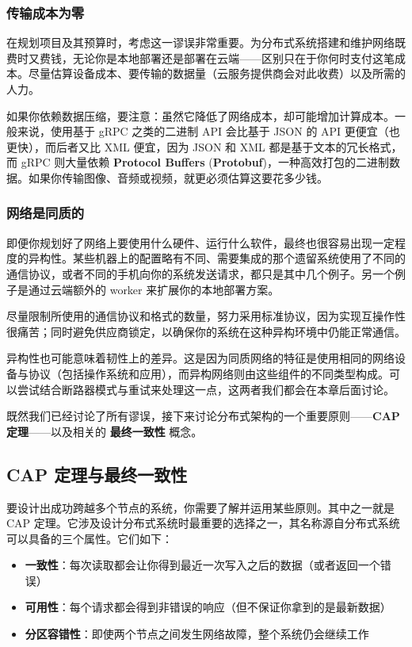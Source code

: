 \subsubsection{传输成本为零}

在规划项目及其预算时，考虑这一谬误非常重要。为分布式系统搭建和维护网络既费时又费钱，无论你是本地部署还是部署在云端——区别只在于你何时支付这笔成本。尽量估算设备成本、要传输的数据量（云服务提供商会对此收费）以及所需的人力。

如果你依赖数据压缩，要注意：虽然它降低了网络成本，却可能增加计算成本。一般来说，使用基于 gRPC 之类的二进制 API 会比基于 JSON 的 API 更便宜（也更快），而后者又比 XML 便宜，因为 JSON 和 XML 都是基于文本的冗长格式，而 gRPC 则大量依赖 \textbf{Protocol Buffers} (\textbf{Protobuf})，一种高效打包的二进制数据。如果你传输图像、音频或视频，就更必须估算这要花多少钱。

\subsubsection{网络是同质的}

即便你规划好了网络上要使用什么硬件、运行什么软件，最终也很容易出现一定程度的异构性。某些机器上的配置略有不同、需要集成的那个遗留系统使用了不同的通信协议，或者不同的手机向你的系统发送请求，都只是其中几个例子。另一个例子是通过云端额外的 worker 来扩展你的本地部署方案。

尽量限制所使用的通信协议和格式的数量，努力采用标准协议，因为实现互操作性很痛苦；同时避免供应商锁定，以确保你的系统在这种异构环境中仍能正常通信。

异构性也可能意味着韧性上的差异。这是因为同质网络的特征是使用相同的网络设备与协议（包括操作系统和应用），而异构网络则由这些组件的不同类型构成。可以尝试结合断路器模式与重试来处理这一点，这两者我们都会在本章后面讨论。

既然我们已经讨论了所有谬误，接下来讨论分布式架构的一个重要原则——\textbf{CAP 定理}——以及相关的 \textbf{最终一致性} 概念。

\subsection{CAP 定理与最终一致性}

\label{idx:294}
\label{idx:295}
要设计出成功跨越多个节点的系统，你需要了解并运用某些原则。其中之一就是 CAP 定理。它涉及设计分布式系统时最重要的选择之一，其名称源自分布式系统可以具备的三个属性。它们如下：

\begin{itemize}
\item \textbf{一致性}：每次读取都会让你得到最近一次写入之后的数据（或者返回一个错误）
\item \textbf{可用性}：每个请求都会得到非错误的响应（但不保证你拿到的是最新数据）
\item \textbf{分区容错性}：即使两个节点之间发生网络故障，整个系统仍会继续工作
\end{itemize}

